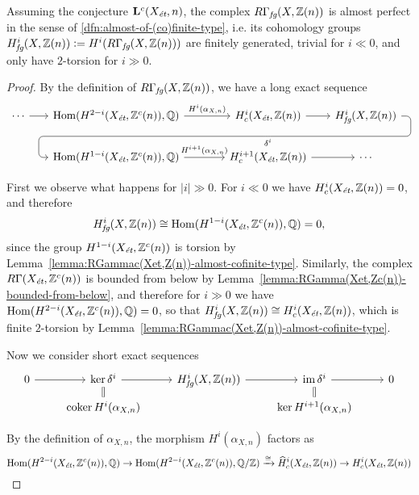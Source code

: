 \documentclass{article}
\numberwithin{equation}{section}
\begin{document}
\begin{proposition}
  \label{prop:RGammafg-almost-perfect}
  Assuming the conjecture $\mathbf{L}^c (X_\et, n)$,
  the complex $R\Gamma_\fg (X, \ZZ (n))$ is almost perfect in the
  sense of \ref{dfn:almost-of-(co)finite-type}, i.e. its cohomology groups
  $H^i_\fg (X, \ZZ (n)) \dfn H^i (R\Gamma_\fg (X, \ZZ (n)))$
  are finitely generated, trivial for $i \ll 0$, and only have $2$-torsion for
  $i \gg 0$.

  \begin{proof}
    By the definition of $R\Gamma_\fg (X, \ZZ (n))$, we have a long exact
    sequence
    \[ \begin{tikzcd}[column sep=1.75em]
      \cdots\ar{r} & \Hom (H^{2-i} (X_\et, \ZZ^c (n)), \QQ) \ar{r}{H^i (\alpha_{X,n})} &[2em] H^i_c (X_\et, \ZZ (n))\ar{r}\ar[draw=none]{d}[name=X, anchor=center]{} & H^i_\fg (X, \ZZ (n)) \ar[rounded corners,to path={ -- ([xshift=2ex]\tikztostart.east) |- (X.center) \tikztonodes -| ([xshift=-2ex]\tikztotarget.west) -- (\tikztotarget)}]{dll}[at end]{\delta^i} \\
      & \Hom (H^{1-i} (X_\et, \ZZ^c (n)), \QQ)\ar{r}{H^{i+1} (\alpha_{X,n})} & H^{i+1}_c (X_\et, \ZZ (n))\ar{r} & \cdots
    \end{tikzcd} \]

    First we observe what happens for $|i| \gg 0$.
    For $i \ll 0$ we have $H^i_c (X_\et, \ZZ (n)) = 0$, and therefore
    $$H^i_\fg (X, \ZZ (n)) \cong \Hom (H^{1-i} (X_\et, \ZZ^c (n)), \QQ) = 0,$$
    since the group $H^{1-i} (X_\et, \ZZ^c (n))$ is torsion by
    Lemma~\ref{lemma:RGammac(Xet,Z(n))-almost-cofinite-type}.
    Similarly, the complex $R\Gamma (X_\et, \ZZ^c (n))$ is bounded from below by
    Lemma~\ref{lemma:RGamma(Xet,Zc(n))-bounded-from-below}, and therefore
    for $i \gg 0$ we have
    $\Hom (H^{2-i} (X_\et, \ZZ^c (n)), \QQ) = 0$, so that
    $H^i_\fg (X, \ZZ (n)) \cong H^i_c (X_\et, \ZZ (n))$, which is finite
    $2$-torsion by Lemma~\ref{lemma:RGammac(Xet,Z(n))-almost-cofinite-type}.

    Now we consider short exact sequences
    \[ \begin{tikzcd}[row sep=0.5em]
      0 \ar{r} & \ker \delta^i \ar{r}\ar[equals]{d} & H^i_\fg (X, \ZZ (n)) \ar{r} & \im \delta^i \ar{r}\ar[equals]{d} & 0\\
      & \coker H^i (\alpha_{X,n}) & & \ker H^{i+1} (\alpha_{X,n})
    \end{tikzcd} \]

    By the definition of $\alpha_{X,n}$, the morphism $H^i (\alpha_{X,n})$ factors as
    \[ \Hom (H^{2-i} (X_\et, \ZZ^c (n)), \QQ) \to
    \Hom (H^{2-i} (X_\et, \ZZ^c (n)), \QQ/\ZZ) \xrightarrow{\cong}
    \widehat{H}^i_c (X_\et, \ZZ (n)) \to H^i_c (X_\et, \ZZ (n)) \]


\end{proof}
\end{proposition}
\end{document}
